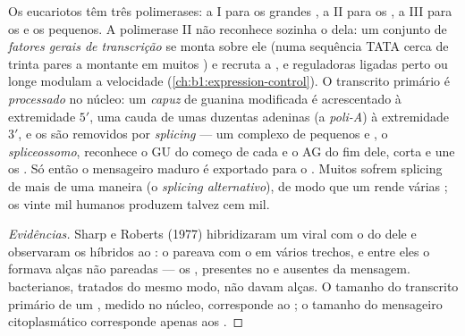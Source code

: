 \begin{proposition}\label{prop:b1:gene-expression:processing}
Os eucariotos têm três polimerases: a I para os grandes , a II para os , a III para os  e os pequenos. A polimerase II não reconhece sozinha o
 dela: um conjunto de \emph{fatores gerais de transcrição} se
monta sobre ele (numa sequência TATA cerca de trinta pares a montante em
muitos ) e recruta a , e  reguladoras ligadas perto
ou longe modulam a velocidade
(\cref{ch:b1:expression-control}). O transcrito primário é
\emph{processado} no núcleo: um \emph{capuz} de guanina modificada é
acrescentado à extremidade $5'$, uma cauda de umas duzentas adeninas (a
\emph{poli-A}) à extremidade $3'$, e os  são removidos por
\emph{splicing} --- um complexo de pequenos  e , o
\emph{spliceossomo}, reconhece o GU do começo de cada  e o AG do
fim dele, corta e une os . Só então o mensageiro maduro é exportado
para o . Muitos  sofrem splicing de mais de uma maneira (o
\emph{splicing alternativo}), de modo que um  rende várias
; os vinte mil  humanos produzem talvez cem mil.
\end{proposition}
\begin{proof}[Evidências]
Sharp e Roberts (1977) hibridizaram um  viral com o  do
 dele e observaram os híbridos ao : o 
pareava com o  em vários trechos, e entre eles o  formava alças
não pareadas --- os , presentes no  e ausentes da mensagem.
 bacterianos, tratados do mesmo modo, não davam alças. O tamanho do
transcrito primário de um , medido no núcleo, corresponde ao ; o
tamanho do mensageiro citoplasmático corresponde apenas aos .
\end{proof}


